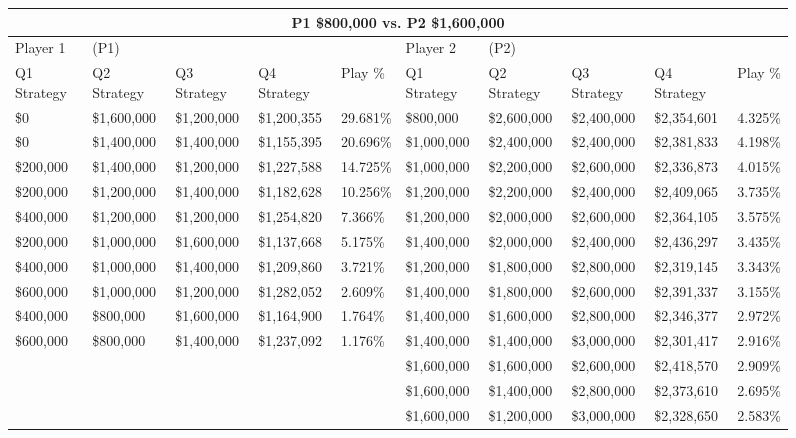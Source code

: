 \documentclass[11pt]{article}
\begin{document}
\begin{figure}
\tiny
\begin{tabular}{ |p{1.0cm}p{1.0cm}p{1.0cm}p{2.0cm}|p{1.0cm}||p{1.0cm}p{1.0cm}p{1.0cm}p{2.0cm}|p{1.0cm}|}
\hline
\multicolumn{10}{|c|}{P1 \$800,000 vs. P2 \$1,600,000} \\
\hline
Player 1 & (P1) & & & & Player 2 & (P2) & & & \\
\hline
Q1 Strategy & Q2 Strategy & Q3 Strategy & Q4 Strategy  &  Play \% & Q1 Strategy & Q2 Strategy & Q3 Strategy & Q4 Strategy  &  Play \%\\
\hline
\$0 & \$1,600,000 & \$1,200,000 & \$1,200,355 & 29.681\% & \$800,000 & \$2,600,000 & \$2,400,000 & \$2,354,601 & 4.325\% \\
\$0 & \$1,400,000 & \$1,400,000 & \$1,155,395 & 20.696\% & \$1,000,000 & \$2,400,000 & \$2,400,000 & \$2,381,833 & 4.198\% \\
\$200,000 & \$1,400,000 & \$1,200,000 & \$1,227,588 & 14.725\% & \$1,000,000 & \$2,200,000 & \$2,600,000 & \$2,336,873 & 4.015\% \\
\$200,000 & \$1,200,000 & \$1,400,000 & \$1,182,628 & 10.256\% & \$1,200,000 & \$2,200,000 & \$2,400,000 & \$2,409,065 & 3.735\% \\
\$400,000 & \$1,200,000 & \$1,200,000 & \$1,254,820 & 7.366\% & \$1,200,000 & \$2,000,000 & \$2,600,000 & \$2,364,105 & 3.575\% \\
\$200,000 & \$1,000,000 & \$1,600,000 & \$1,137,668 & 5.175\% & \$1,400,000 & \$2,000,000 & \$2,400,000 & \$2,436,297 & 3.435\% \\
\$400,000 & \$1,000,000 & \$1,400,000 & \$1,209,860 & 3.721\% & \$1,200,000 & \$1,800,000 & \$2,800,000 & \$2,319,145 & 3.343\% \\
\$600,000 & \$1,000,000 & \$1,200,000 & \$1,282,052 & 2.609\% & \$1,400,000 & \$1,800,000 & \$2,600,000 & \$2,391,337 & 3.155\% \\
\$400,000 & \$800,000 & \$1,600,000 & \$1,164,900 & 1.764\% & \$1,400,000 & \$1,600,000 & \$2,800,000 & \$2,346,377 & 2.972\% \\
\$600,000 & \$800,000 & \$1,400,000 & \$1,237,092 & 1.176\% & \$1,400,000 & \$1,400,000 & \$3,000,000 & \$2,301,417 & 2.916\% \\
&&&& & \$1,600,000 & \$1,600,000 & \$2,600,000 & \$2,418,570 & 2.909\% \\
&&&& & \$1,600,000 & \$1,400,000 & \$2,800,000 & \$2,373,610 & 2.695\% \\
&&&& & \$1,600,000 & \$1,200,000 & \$3,000,000 & \$2,328,650 & 2.583\% \\

\end{tabular}
\end{figure}
\end{document}
